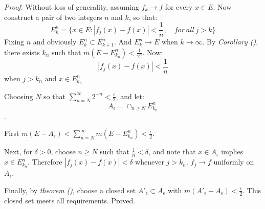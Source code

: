 \documentclass[
]{article}
\begin{document}
\textit{Proof.} Without loss of generality, assuming \(f_k\to f\) for every \(x\in E\).
Now construct a pair of two integers \(n\) and \(k\), so that:
\[E_k^n = \{x\in E: |f_j(x)-f(x)|<\frac{1}{n},\quad for\ all\ j>k\}\]
Fixing \(n\) and obviously \(E_k^n\subset E_{k+1}^n\). And \(E_k^n \to E\) when \(k\to \infty\).
By \textit{Corollary ()}, there exists \(k_n\) such that \(m(E-E_{k_n}^n)<\frac{1}{2^n}\).
Now:
\[|f_j(x)-f(x)|<\frac{1}{n}\]
when \(j>k_n\) and \(x\in E_{k_n}^n\)

Choosing \(N\) so that \(\sum_{n=N}^{\infty}2^{-n}<\frac{\epsilon}{2}\), and let:
\[A_{\epsilon}=\cap_{n\geq N}E_{k_n}^n\].

First \(m(E-A_{\epsilon})<\sum_{n=N}^{\infty}m(E-E_{k_n}^n)<\frac{\epsilon}{2}\).

Next, for \(\delta>0\), choose \(n\geq N\) such that \(\frac{1}{n}<\delta\), and note that \(x\in A_{\epsilon}\)
implies \(x\in E_{k_n}^n\). Therefore \(|f_j(x)-f(x)| < \delta\) whenever \(j > k_n\). \(f_j\to f\) uniformly on
\(A_{\epsilon}\).

Finally, by \textit{theorem ()}, choose a closed set \(A'_{\epsilon}\subset A_{\epsilon}\) with
\(m(A'_{\epsilon}-A_{\epsilon})<\frac{\epsilon}{2}\). This closed set meets all requirements. Proved.
\end{document}
